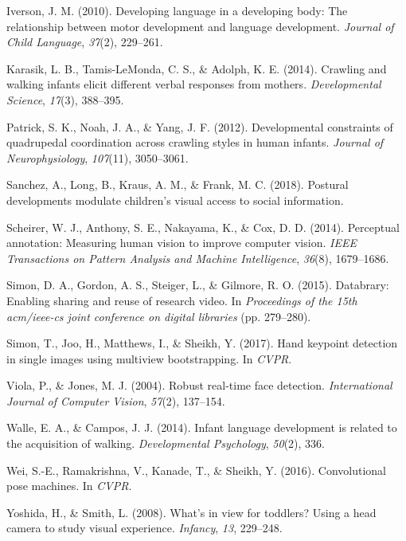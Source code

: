 \documentclass[english,man,floatsintext]{apa6}
\begin{document}
\hypertarget{ref-iverson2010}{}
Iverson, J. M. (2010). Developing language in a developing body: The
relationship between motor development and language development.
\emph{Journal of Child Language}, \emph{37}(2), 229--261.

\hypertarget{ref-karasik2014}{}
Karasik, L. B., Tamis-LeMonda, C. S., \& Adolph, K. E. (2014). Crawling
and walking infants elicit different verbal responses from mothers.
\emph{Developmental Science}, \emph{17}(3), 388--395.

\hypertarget{ref-patrick2012developmental}{}
Patrick, S. K., Noah, J. A., \& Yang, J. F. (2012). Developmental
constraints of quadrupedal coordination across crawling styles in human
infants. \emph{Journal of Neurophysiology}, \emph{107}(11), 3050--3061.

\hypertarget{ref-sanchez2018postural}{}
Sanchez, A., Long, B., Kraus, A. M., \& Frank, M. C. (2018). Postural
developments modulate children's visual access to social information.

\hypertarget{ref-scheirer2014perceptual}{}
Scheirer, W. J., Anthony, S. E., Nakayama, K., \& Cox, D. D. (2014).
Perceptual annotation: Measuring human vision to improve computer
vision. \emph{IEEE Transactions on Pattern Analysis and Machine
Intelligence}, \emph{36}(8), 1679--1686.

\hypertarget{ref-simon2015databrary}{}
Simon, D. A., Gordon, A. S., Steiger, L., \& Gilmore, R. O. (2015).
Databrary: Enabling sharing and reuse of research video. In
\emph{Proceedings of the 15th acm/ieee-cs joint conference on digital
libraries} (pp. 279--280).

\hypertarget{ref-simon2017hand}{}
Simon, T., Joo, H., Matthews, I., \& Sheikh, Y. (2017). Hand keypoint
detection in single images using multiview bootstrapping. In
\emph{CVPR}.

\hypertarget{ref-viola2004robust}{}
Viola, P., \& Jones, M. J. (2004). Robust real-time face detection.
\emph{International Journal of Computer Vision}, \emph{57}(2), 137--154.

\hypertarget{ref-walle2014}{}
Walle, E. A., \& Campos, J. J. (2014). Infant language development is
related to the acquisition of walking. \emph{Developmental Psychology},
\emph{50}(2), 336.

\hypertarget{ref-wei2016cpm}{}
Wei, S.-E., Ramakrishna, V., Kanade, T., \& Sheikh, Y. (2016).
Convolutional pose machines. In \emph{CVPR}.

\hypertarget{ref-yoshida2008}{}
Yoshida, H., \& Smith, L. (2008). What's in view for toddlers? Using a
head camera to study visual experience. \emph{Infancy}, \emph{13},
229--248.
\end{document}
